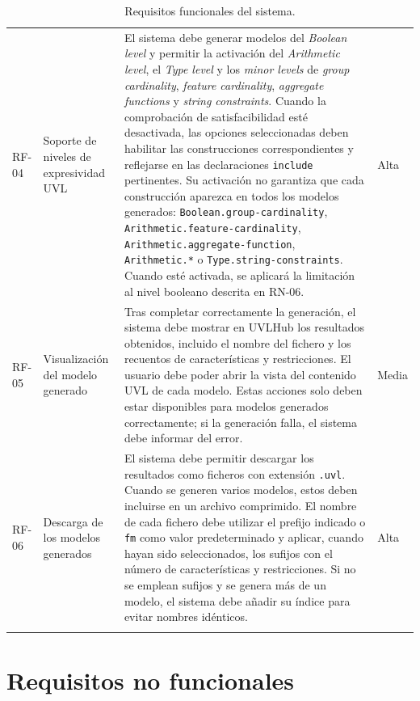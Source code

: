 \begin{longtable}{@{}P{1.25cm} P{3.2cm}
P{\dimexpr\textwidth-5.7cm-6\tabcolsep\relax} P{1.25cm}@{}}
RF-04 &
Soporte de niveles de expresividad UVL &
El sistema debe generar modelos del \textit{Boolean level} y permitir la
activación del \textit{Arithmetic level}, el \textit{Type level} y los
\textit{minor levels} de \textit{group cardinality}, \textit{feature
cardinality}, \textit{aggregate functions} y \textit{string constraints}. Cuando la comprobación de satisfacibilidad esté desactivada, las
opciones seleccionadas deben habilitar las construcciones correspondientes
y reflejarse en las declaraciones \texttt{include} pertinentes. Su
activación no garantiza que cada construcción aparezca en todos los
modelos generados:
\texttt{Boolean.group-cardinality},
\texttt{Arithmetic.feature-cardinality},
\texttt{Arithmetic.aggregate-function}, \texttt{Arithmetic.*} o
\texttt{Type.string-constraints}. Cuando esté activada, se aplicará
la limitación al nivel booleano descrita en RN-06.
&
Alta \\[0.8em]

RF-05 &
Visualización del modelo generado &
Tras completar correctamente la generación, el sistema debe mostrar
en UVLHub los resultados obtenidos, incluido el nombre del fichero
y los recuentos de características y restricciones. El usuario debe
poder abrir la vista del contenido UVL de cada modelo. Estas acciones
solo deben estar disponibles para modelos generados correctamente;
si la generación falla, el sistema debe informar del error.
&
Media \\[0.8em]

RF-06 &
Descarga de los modelos generados &
El sistema debe permitir descargar los resultados como ficheros con extensión
\texttt{.uvl}. Cuando se generen varios modelos, estos deben incluirse en un
archivo comprimido. El nombre de cada fichero debe utilizar el prefijo indicado
o \texttt{fm} como valor predeterminado y aplicar, cuando hayan sido
seleccionados, los sufijos con el número de características y restricciones. Si
no se emplean sufijos y se genera más de un modelo, el sistema debe añadir su
índice para evitar nombres idénticos.
&
Alta \\

\bottomrule
\caption{Requisitos funcionales del sistema.}
\label{tab:requisitos-funcionales}
\end{longtable}

\section{Requisitos no funcionales}
\label{sec:rnf}

